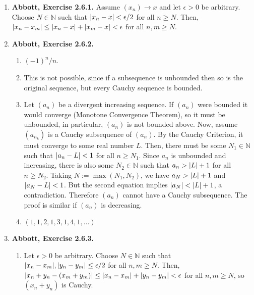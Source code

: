 \documentclass{article}
\DeclarePairedDelimiter\abs{\lvert}{\rvert}
\newcommand{\N}{\mathbb{N}}
\newcommand{\exc}[2][Abbott]{\item \textbf{#1, Exercise #2.}}
\newcommand{\lep}[1][L]{#1et $\epsilon > 0$ be arbitrary}
\let\oldmax\max
\renewcommand{\max}[1]{\oldmax \left( #1 \right)}
\begin{document}
\begin{enumerate}
    To see that $(a_{n_k}) \to 0$, \lep[l]. Choose $N \in \N$ such that $N > 1/\epsilon$. Since $s-1/k < a_{n_k} \leq s+1/k$ for every $k \in \N$, then $\abs*{a_{n_k} - s} \leq 1/k$. Letting $k \geq N$, we have $\abs*{a_{n_k}-s} \leq 1/k < \epsilon$, and we are done.

    \exc{2.6.1}
    Assume $(x_n) \to x$ and \lep[l]. Choose $N \in \N$ such that $\abs*{x_n-x} < \epsilon/2$ for all $n \geq N$. Then, $\abs*{x_n-x_m} \leq \abs*{x_n-x} + \abs*{x_m-x} < \epsilon$ for all $n,m \geq N$.
    
    \exc{2.6.2}
    \begin{enumerate}
        \item $(-1)^n/n$.
        
        \item This is not possible, since if a subsequence is unbounded then so is the original sequence, but every Cauchy sequence is bounded.
        
        \item Let $(a_n)$ be a divergent increasing sequence. If $(a_n)$ were bounded it would converge (Monotone Convergence Theorem), so it must be unbounded, in particular, $(a_n)$ is not bounded above. Now, assume $(a_{n_k})$ is a Cauchy subsequence of $(a_n)$. By the Cauchy Criterion, it must converge to some real number $L$. Then, there must be some $N_1 \in \N$ such that $\abs*{a_n - L} < 1$ for all $n \geq N_1$. Since $a_n$ is unbounded and increasing, there is also some $N_2 \in \N$ such that $a_n > \abs*{L}+1$ for all $n \geq N_2$. Taking $N := \max{N_1, N_2}$, we have $a_N > \abs*{L} + 1$ and $\abs*{a_N-L} < 1$. But the second equation implies $\abs*{a_N} < \abs*{L} + 1$, a contradiction. Therefore $(a_n)$ cannot have a Cauchy subsequence. The proof is similar if $(a_n)$ is decreasing.
        
        \item $(1, 1, 2, 1, 3, 1, 4, 1, \dots)$
    \end{enumerate}
    
    \exc{2.6.3}
    \begin{enumerate}
        \item \lep. Choose $N \in \N$ such that 
         $\abs*{x_n-x_m}, \abs*{y_n-y_m} \leq \epsilon/2$ for all $n,m \geq N$. Then, $\abs*{x_n+y_n-(x_m+y_m)} \leq \abs*{x_n-x_m} + \abs*{y_n-y_m} < \epsilon$ for all $n,m \geq N$, so $(x_n + y_n)$ is Cauchy.
        

\end{enumerate}
\end{enumerate}
\end{document}
